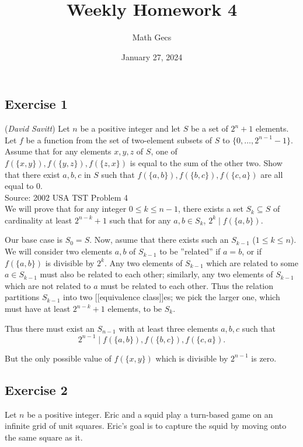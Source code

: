 \documentclass[12pt]{article}
\title{Weekly Homework 4}
\author{Math Gecs}
\date{January 27, 2024}
\renewenvironment{proof}{{\bfseries Proof.}}{}
\begin{document}
\maketitle

\subsection*{Exercise 1}
(\textit{David Savitt})
Let $n$ be a positive integer and let $S$ be a set of $2^n+1$ elements. Let $f $ be a function from the set of two-element subsets of $S $ to $\{0, \dots, 2^{n-1}-1\}$. Assume that for any elements $x, y, z$ of $S $, one of $f(\{x,y\}), f(\{y,z\}), f(\{z, x\}) $ is equal to the sum of the other two. Show that there exist $a, b, c $ in $S $ such that $f(\{a,b\}), f(\{b,c\}), f(\{c,a\}) $ are all equal to 0.\\

Source: 2002 USA TST Problem 4\\



\begin{proof}
We will prove that for any integer $ 0 \le k \le n-1 $, there exists a set $ S_k \subseteq S $ of cardinality at least $2^{n-k} + 1 $ such that for any $ a, b \in S_k $, $ 2^k \mid f(\{a,b\}) $.

Our base case is $S_0 = S $.  Now, asume that there exists such an $S_{k-1} $ ($1 \le k \le n$).  We will consider two elements $a, b $ of $S_{k-1} $ to be ''related'' if $a=b $, or if $f(\{a,b\}) $ is divisible by $2^k $.  Any two elements of $S_{k-1} $ which are related to some $ a \in S_{k-1} $ must also be related to each other; similarly, any two elements of $S_{k-1} $ which are not related to $a $ must be related to each other.  Thus the relation partitions $S_{k-1} $ into two [[equivalence class]]es; we pick the larger one, which must have at least $2^{n-k} + 1 $ elements, to be $S_k $.

Thus there must exist an $S_{n-1} $ with at least three elements $a,b,c $ such that 
$$ 2^{n-1} \mid f(\{a,b\}), f(\{b,c\}), f(\{c,a\}).$$ 

But the only possible value of ${} f(\{x,y\}) $ which is divisible by $2^{n-1} $ is zero.
\end{proof}

\vspace{2in}






\subsection*{Exercise 2}
Let $n$ be a positive integer. Eric and a squid play a turn-based game on an infinite grid of unit squares. Eric's goal is to capture the squid by moving onto the same square as it.
\end{document}
